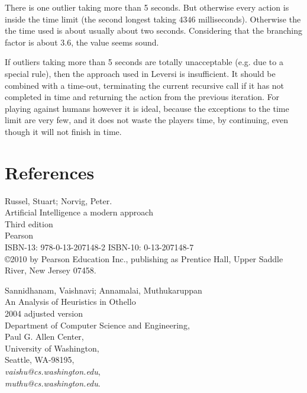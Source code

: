 \documentclass[a4paper,11pt]{article}
\begin{document}
There is one outlier taking more than 5 seconds. But otherwise every action is inside the time limit (the second longest taking $4346$ milliseconds). Otherwise the the time used is about usually about two seconds. Considering that the branching factor is about $3.6$, the value seems sound.

If outliers taking more than 5 seconds are totally unacceptable (e.g. due to a special rule), then the approach used in Leversi is insufficient. It should be combined with a time-out, terminating the current recursive call if it has not completed in time and returning the action from the previous iteration. For playing against humans however it is ideal, because the exceptions to the time limit are very few, and it does not waste the players time, by continuing, even though it will not finish in time.

\clearpage

\section{References}
\begin{thebibliography}{99}

 Russel, Stuart; Norvig, Peter. \\
Artificial Intelligence a modern approach \\
Third edition \\
Pearson \\
ISBN-13:	978-0-13-207148-2
ISBN-10:	0-13-207148-7 \\
\copyright 2010 by Pearson Education Inc., publishing as Prentice Hall, Upper Saddle River, New Jersey 07458.

 Sannidhanam, Vaishnavi; Annamalai, Muthukaruppan \\
An Analysis of Heuristics in Othello \\
2004 adjusted version \\
Department of Computer Science and Engineering, \\
Paul G. Allen Center, \\
University of Washington, \\
Seattle, WA-98195, \\
\textit{vaishu@cs.washington.edu}, \\
\textit{muthu@cs.washington.edu}.

\end{thebibliography}
\end{document}
